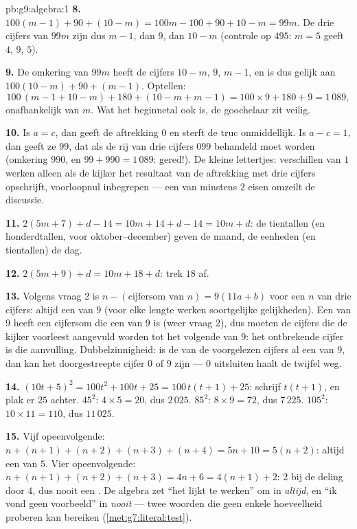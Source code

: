 \begin{solution}{pb:g9:algebra:1}
\textbf{8.} $100(m - 1) + 90 + (10 - m) = 100m - 100 + 90 + 10 - m = 99m$. De drie
cijfers van $99m$ zijn dus $m - 1$, dan $9$, dan $10 - m$ (controle op $495$:
$m = 5$ geeft $4$, $9$, $5$).

\textbf{9.} De omkering van $99m$ heeft de cijfers $10 - m$, $9$, $m - 1$, en is
dus gelijk aan $100(10 - m) + 90 + (m - 1)$. Optellen:
\[
100\,(m - 1 + 10 - m) + 180 + (10 - m + m - 1)
= 100 \times 9 + 180 + 9 = 1\,089 ,
\]
onafhankelijk van $m$. Wat het beginnetal ook is, de goochelaar zit veilig.

\textbf{10.} Is $a = c$, dan geeft de aftrekking $0$ en sterft de truc
onmiddellijk. Is $a - c = 1$, dan geeft ze $99$, dat als de rij van drie cijfers
$099$ behandeld moet worden (omkering $990$, en $99 + 990 = 1\,089$: gered!). De
kleine lettertjes: verschillen van $1$ werken alleen als de kijker het resultaat
van de aftrekking met drie cijfers opschrijft, voorloopnul inbegrepen --- een
 van minstens $2$ eisen omzeilt de discussie.

\textbf{11.} $2(5m + 7) + d - 14 = 10m + 14 + d - 14 = 10m + d$: de tientallen (en
honderdtallen, voor oktober--december) geven de maand, de eenheden (en tientallen)
de dag.

\textbf{12.} $2(5m + 9) + d = 10m + 18 + d$: trek $18$ af.

\textbf{13.} Volgens vraag 2 is $n - (\text{cijfersom van } n) = 9(11a + b)$ voor
een $n$ van drie cijfers: altijd een  van $9$ (voor elke lengte werken
soortgelijke gelijkheden). Een  van $9$ heeft een cijfersom die een
 van $9$ is (weer vraag 2), dus moeten de cijfers die de kijker voorleest
aangevuld worden tot het volgende  van $9$: het ontbrekende cijfer is die
aanvulling. Dubbelzinnigheid: is de  van de voorgelezen cijfers al een 
van $9$, dan kan het doorgestreepte cijfer $0$ of $9$ zijn --- $0$ uitsluiten haalt
de twijfel weg.

\textbf{14.} $(10t + 5)^2 = 100t^2 + 100t + 25 = 100\,t(t + 1) + 25$: schrijf
$t(t+1)$, en plak er $25$ achter. $45^2$: $4 \times 5 = 20$, dus $2\,025$.
$85^2$: $8 \times 9 = 72$, dus $7\,225$. $105^2$: $10 \times 11 = 110$, dus
$11\,025$.

\textbf{15.} Vijf opeenvolgende: $n + (n+1) + (n+2) + (n+3) + (n+4) = 5n + 10
= 5(n + 2)$: altijd een  van $5$. Vier opeenvolgende:
$n + (n+1) + (n+2) + (n+3) = 4n + 6 = 4(n + 1) + 2$:  $2$ bij de deling door
$4$, dus nooit een . De algebra zet ``het lijkt te werken'' om in
\emph{altijd}, en ``ik vond geen voorbeeld'' in \emph{nooit} --- twee woorden die
geen enkele hoeveelheid proberen kan bereiken (\cref{met:g7:literal:test}).
\end{solution}
